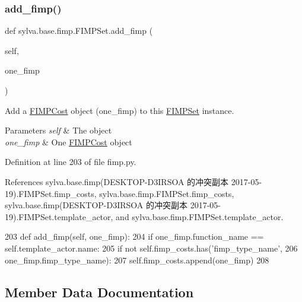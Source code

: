 \subsubsection{\texorpdfstring{add\+\_\+fimp()}{add\_fimp()}}
{\footnotesize\ttfamily def sylva.\+base.\+fimp.\+F\+I\+M\+P\+Set.\+add\+\_\+fimp (\begin{DoxyParamCaption}\item[{}]{self,  }\item[{}]{one\+\_\+fimp }\end{DoxyParamCaption})}



Add a \hyperlink{classsylva_1_1base_1_1fimp_1_1_f_i_m_p_cost}{F\+I\+M\+P\+Cost} object (one\+\_\+fimp) to this \hyperlink{classsylva_1_1base_1_1fimp_1_1_f_i_m_p_set}{F\+I\+M\+P\+Set} instance. 


\begin{DoxyParams}{Parameters}
{\em self} & The object \\
\hline
{\em one\+\_\+fimp} & One \hyperlink{classsylva_1_1base_1_1fimp_1_1_f_i_m_p_cost}{F\+I\+M\+P\+Cost} object \\
\hline
\end{DoxyParams}


Definition at line 203 of file fimp.\+py.



References sylva.\+base.\+fimp(\+D\+E\+S\+K\+T\+O\+P-\/\+D3\+I\+R\+S\+O\+A 的冲突副本 2017-\/05-\/19).\+F\+I\+M\+P\+Set.\+fimp\+\_\+costs, sylva.\+base.\+fimp.\+F\+I\+M\+P\+Set.\+fimp\+\_\+costs, sylva.\+base.\+fimp(\+D\+E\+S\+K\+T\+O\+P-\/\+D3\+I\+R\+S\+O\+A 的冲突副本 2017-\/05-\/19).\+F\+I\+M\+P\+Set.\+template\+\_\+actor, and sylva.\+base.\+fimp.\+F\+I\+M\+P\+Set.\+template\+\_\+actor.


\begin{DoxyCode}
203     \textcolor{keyword}{def }add\_fimp(self, one\_fimp):
204         \textcolor{keywordflow}{if} one\_fimp.function\_name == self.template\_actor.name:
205             \textcolor{keywordflow}{if} \textcolor{keywordflow}{not} self.fimp\_costs.has(\textcolor{stringliteral}{'fimp\_type\_name'},
206                                        one\_fimp.fimp\_type\_name):
207                 self.fimp\_costs.append(one\_fimp)
208 
\end{DoxyCode}


\subsection{Member Data Documentation}
\mbox{\label{classsylva_1_1base_1_1fimp_1_1_f_i_m_p_set_a1e7a61973ef2e8b484fdc015782774ec}} 
